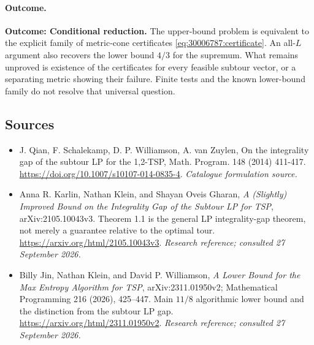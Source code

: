 \documentclass[11pt,a4paper]{article}
\numberwithin{equation}{section}
\begin{document}
\paragraph{Outcome.}
\textbf{Outcome: Conditional reduction.}
The upper-bound problem is equivalent to the explicit family of
metric-cone certificates \eqref{eq:30006787:certificate}. An all-$L$ argument
also recovers the lower bound $4/3$ for the supremum. What remains
unproved is existence of the certificates for every feasible subtour
vector, or a separating metric showing their failure. Finite tests and
the known lower-bound family do not resolve that universal question.

\subsection{Sources}
\begin{itemize}\raggedright
\item[\textnormal{[S1]}]\hypertarget{source:30006787:1}{} J. Qian, F. Schalekamp, D. P. Williamson, A. van Zuylen, On the integrality gap of the subtour LP for the 1,2-TSP, Math. Program. 148 (2014) 411-417.
\url{https://doi.org/10.1007/s10107-014-0835-4}.
{\small\textit{Catalogue formulation source.}}
\item[\textnormal{[E1]}]\hypertarget{extra:30006787:1}{} Anna R. Karlin, Nathan Klein, and Shayan Oveis Gharan, \emph{A (Slightly) Improved Bound on the Integrality Gap of the Subtour LP for TSP}, arXiv:2105.10043v3. Theorem 1.1 is the general LP integrality-gap theorem, not merely a guarantee relative to the optimal tour.
\url{https://arxiv.org/html/2105.10043v3}.
{\small\textit{Research reference; consulted 27 September 2026.}}
\item[\textnormal{[E2]}]\hypertarget{extra:30006787:2}{} Billy Jin, Nathan Klein, and David P. Williamson, \emph{A Lower Bound for the Max Entropy Algorithm for TSP}, arXiv:2311.01950v2; Mathematical Programming 216 (2026), 425--447. Main $11/8$ algorithmic lower bound and the distinction from the subtour LP gap.
\url{https://arxiv.org/html/2311.01950v2}.
{\small\textit{Research reference; consulted 27 September 2026.}}
\end{itemize}
\end{document}
